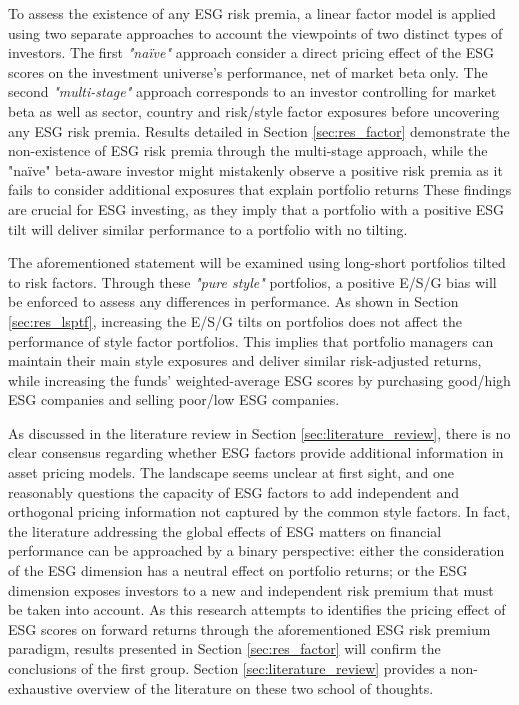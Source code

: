 \documentclass[11pt,a4paper]{article}
\begin{document}
To assess the existence of any ESG risk premia, a linear factor model is applied using two separate approaches to account the viewpoints of two distinct types of investors.
The first \textit{"naïve"} approach consider a direct pricing effect of the ESG scores on the investment universe's performance, net of market beta only. 
The second \textit{"multi-stage"} approach corresponds to an investor controlling for market beta as well as sector, country and risk/style factor exposures before uncovering any ESG risk premia. 
Results detailed in Section \ref{sec:res_factor} demonstrate the non-existence of ESG risk premia through the multi-stage approach, while the "naïve" beta-aware investor might mistakenly observe a positive risk premia as it fails to consider additional exposures that explain portfolio returns  
These findings are crucial for ESG investing, as they imply that a portfolio with a positive ESG tilt will deliver similar performance to a portfolio with no tilting. 

The aforementioned statement will be examined using long-short portfolios tilted to risk factors. Through these \textit{"pure style"} portfolios, a positive E/S/G bias will be enforced to assess any differences in performance. 
As shown in Section \ref{sec:res_lsptf}, increasing the E/S/G tilts on portfolios does not affect the performance of style factor portfolios.
This implies that portfolio managers can maintain their main style exposures and deliver similar risk-adjusted returns, while increasing the funds' weighted-average ESG scores by purchasing good/high ESG companies and selling poor/low ESG companies. 

As discussed in the literature review in Section \ref{sec:literature_review}, there is no clear consensus regarding whether ESG factors provide additional information in asset pricing models. 
The landscape seems unclear at first sight, and one reasonably questions the capacity of ESG factors to add independent and orthogonal pricing information not captured by the common style factors.
In fact, the literature addressing the global effects of ESG matters on financial performance can be approached by a binary perspective: either the consideration of the ESG dimension has a neutral effect on portfolio returns; or the ESG dimension exposes investors to a new and independent risk premium that must be taken into account. 
As this research attempts to identifies the pricing effect of ESG scores on forward returns through the aforementioned ESG risk premium paradigm, results presented in Section \ref{sec:res_factor} will confirm the conclusions of the first group.
Section \ref{sec:literature_review} provides a non-exhaustive overview of the literature on these two school of thoughts. 
\end{document}
